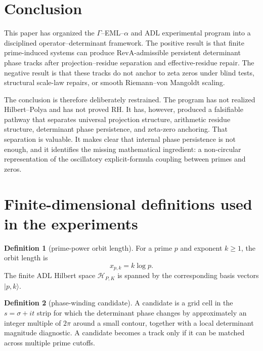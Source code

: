 \documentclass[11pt]{article}
\theoremstyle{definition}
\newtheorem{definition}{Definition}
\theoremstyle{plain}
\begin{document}
\section{Conclusion}

This paper has organized the $\Gamma$--EML--$\alpha$ and ADL experimental program into a disciplined operator--determinant framework.  The positive result is that finite prime-induced systems can produce RevA-admissible persistent determinant phase tracks after projection--residue separation and effective-residue repair.  The negative result is that these tracks do not anchor to zeta zeros under blind tests, structural scale-law repairs, or smooth Riemann--von Mangoldt scaling.

The conclusion is therefore deliberately restrained.  The program has not realized Hilbert--Polya and has not proved RH.  It has, however, produced a falsifiable pathway that separates universal projection structure, arithmetic residue structure, determinant phase persistence, and zeta-zero anchoring.  That separation is valuable.  It makes clear that internal phase persistence is not enough, and it identifies the missing mathematical ingredient: a non-circular representation of the oscillatory explicit-formula coupling between primes and zeros.

\appendix

\section{Finite-dimensional definitions used in the experiments}

\begin{definition}[prime-power orbit length]
For a prime $p$ and exponent $k\ge1$, the orbit length is
\begin{equation}
  x_{p,k}=k\log p.
\end{equation}
The finite ADL Hilbert space $\mathcal H_{P,K}$ is spanned by the corresponding basis vectors $|p,k\rangle$.
\end{definition}

\begin{definition}[phase-winding candidate]
A candidate is a grid cell in the $s=\sigma+it$ strip for which the determinant phase changes by approximately an integer multiple of $2\pi$ around a small contour, together with a local determinant magnitude diagnostic.  A candidate becomes a track only if it can be matched across multiple prime cutoffs.
\end{definition}
\end{document}
